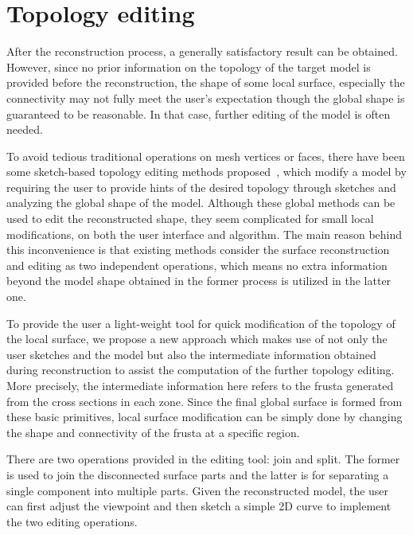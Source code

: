 \section{Topology editing}
\label{ch6:sec:edit}

After the reconstruction  process, a generally satisfactory result
can be obtained. However, since no prior information on the topology
of the target model is provided before the reconstruction, the shape
of some local surface, especially the connectivity may not fully
meet the user's expectation though the global shape is guaranteed to
be reasonable. In that case, further editing of the model is often
needed.

To avoid tedious traditional  operations on mesh vertices or faces,
there have been some sketch-based topology editing methods
proposed~\cite{HRABV11,JT09,JZH07}, which modify a model by
requiring the user to provide hints of the desired topology through
sketches and analyzing the global shape of the model. Although these
global methods can be used to edit the reconstructed shape, they
seem complicated for small local modifications, on both the user
interface and algorithm. The main reason behind this inconvenience
is that existing methods consider the surface reconstruction and
editing as two independent operations, which means no extra
information beyond the model shape obtained in the former process is
utilized in the latter one.

To provide the user a light-weight  tool for quick modification of
the topology of the local surface, we propose a new approach which
makes use of not only the user sketches and the model but also the
intermediate information obtained during reconstruction to assist
the computation of the further topology editing. More precisely, the
intermediate information here refers to the frusta generated from
the cross sections in each zone. Since the final global surface is
formed from these basic primitives, local surface modification can
be simply done by changing the shape and connectivity of the frusta
at a specific region.

There are two operations provided in  the editing tool: join and
split. The former is used to join the disconnected surface parts and
the latter is for separating a single component into multiple parts.
Given the reconstructed model, the user can first adjust the
viewpoint and then sketch a simple 2D curve to implement the two
editing operations.


